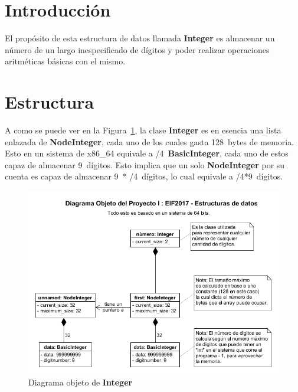 \newcommand\bytes{128}
\newcommand\digits{9}
\newcommand\base{4}

\section{Introducción}
El propósito de esta estructura de datos llamada \textbf{Integer} es almacenar
un número de un largo inespecificado de dígitos y poder realizar operaciones
aritméticas básicas con el mismo.
\section{Estructura}
A como se puede ver en la Figura~\ref{fig:dig_obj}, la clase \textbf{Integer} es
en esencia una lista enlazada de \textbf{NodeInteger}, cada uno de los cuales
gasta \bytes\ bytes de memoria. Esto en un sistema de x86\_64 equivale a
\the\numexpr\bytes/\base\relax\ \textbf{BasicInteger}, cada uno de estos capaz
de almacenar \digits\ dígitos. Esto implica que un solo \textbf{NodeInteger} por su 
cuenta es capaz de almacenar \digits\ $*$ \the\numexpr\bytes/\base\relax\ dígitos,
lo cual equivale a \the\numexpr\bytes/\base*\digits\relax\ dígitos.
\begin{figure}[H]
\centering
  \includegraphics[width=\linewidth]{./img/object_diagram.png}
  \caption{Diagrama objeto de \textbf{Integer}}
\label{fig:dig_obj}
\end{figure}
